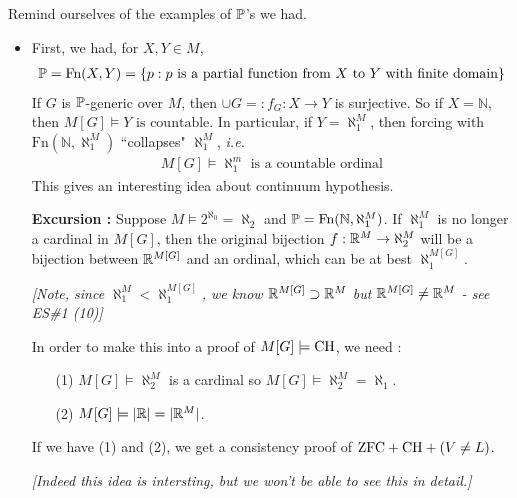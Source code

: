 \documentclass[12pt,a4paper]{article}
\begin{document}
\quad Remind ourselves of the examples of $\mathbb{P}$'s we had.
\begin{itemize}
\item First, we had, for $X, Y\in M$,
\begin{align*}
\mathbb{P} = \text{Fn}(X, Y) = \{p: p\text{ is a partial function from }X \text{ to }Y\text{ with finite domain}\}
\end{align*}
If $G$ is $\mathbb{P}$-generic over $M$, then $\cup G=: f_G : X\rightarrow Y$ is surjective. So if $X = \mathbb{N}$, then $M[G] \models Y\text{ is countable}$. In particular, if $Y = \aleph_1^M$, then forcing with $\text{Fn}(\mathbb{N}, \aleph_1^M)$ ``collapses" $\aleph_1^M$, \textit{i.e.}
\begin{align*}
M[G] \models \aleph_1^m \text{ is a countable ordinal}
\end{align*}
This gives an interesting idea about continuum hypothesis.

\textbf{Excursion :} Suppose $M \models 2^{\aleph_0} = \aleph_2$ and $\mathbb{P} = \text{Fn}(\mathbb{N}, \aleph_1^M)$. If $\aleph_1^M$ is no longer a cardinal in $M[G]$, then the original bijection $f: \mathbb{R}^M \rightarrow \aleph_2^M$ will be a bijection between $\mathbb{R}^{M[G]}$ and an ordinal, which can be at best $\aleph_1^{M[G]}$.

\emph{[Note, since $\aleph_1^M < \aleph_1^{M[G]}$, we know $\mathbb{R}^{M[G]} \supset \mathbb{R}^M$ but $\mathbb{R}^{M[G]} \neq \mathbb{R}^M$ - see ES\#1 (10)]}

\quad In order to make this into a proof of $M[G] \models \text{CH}$, we need :
\begin{itemize}
\item[(1)] $M[G] \models \aleph_2^M$ is a cardinal so $M[G] \models \aleph_2^M = \aleph_1$. 
\item[(2)] $M[G] \models |\mathbb{R}| = |\mathbb{R}^M|$.
\end{itemize}
If we have (1) and (2), we get a consistency proof of $\text{ZFC} + \text{CH} + (V\neq L)$.

\emph{[Indeed this idea is intersting, but we won't be able to see this in detail.]}


\end{itemize}
\end{document}
